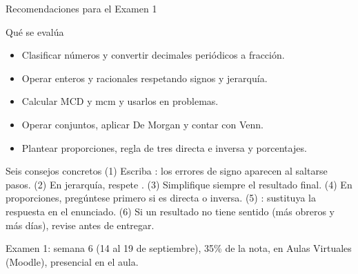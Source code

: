 \documentclass[aspectratio=169,10pt]{beamer}
\begin{document}
\begin{frame}{Recomendaciones para el Examen 1}
  \begin{block}{Qué se evalúa}
    \tiny
    \begin{itemize}\setlength{\itemsep}{-0.02cm}
      \item Clasificar números y convertir decimales periódicos a fracción.
      \item Operar enteros y racionales respetando signos y jerarquía.
      \item Calcular MCD y mcm y usarlos en problemas.
      \item Operar conjuntos, aplicar De Morgan y contar con Venn.
      \item Plantear proporciones, regla de tres directa e inversa y
            porcentajes.
    \end{itemize}
  \end{block}

  \vspace{0.08cm}
  \begin{alertblock}{Seis consejos concretos}
    \tiny
    (1) Escriba : los errores de signo aparecen al
    saltarse pasos. \quad
    (2) En jerarquía, respete . \quad
    (3) Simplifique siempre el resultado final. \quad
    (4) En proporciones, pregúntese primero si es directa o inversa. \quad
    (5) : sustituya la respuesta en el enunciado. \quad
    (6) Si un resultado no tiene sentido (más obreros y más días), revise antes
    de entregar.
  \end{alertblock}

  \vspace{0.05cm}
  {\tiny\color{uniGris} Examen 1: semana 6 (14 al 19 de septiembre), 35\% de
  la nota, en Aulas Virtuales (Moodle), presencial en el aula.}
\end{frame}
\end{document}
